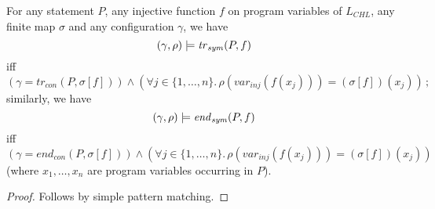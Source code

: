 \begin{lemma}\label{lem:symConcreteTranslationMatch}
    For any statement $P$, any injective function $f$ on program variables of $L_{\mathit{CHL}}$,
    any finite map $\sigma$ and any configuration $\gamma$,
    we have
    \begin{equation*}
        (\gamma, \rho) \models \mathit{tr}_{\mathit{sym}}(P, f)
    \end{equation*}
    iff %
    \begin{equation*}
        (\gamma = \mathit{tr}_{\mathit{con}}(P, \sigma[f])) \land (\forall j \in \{ 1, \ldots, n \}.\, \rho(\mathit{var}_{\mathit{inj}}(f(x_j))) = (\sigma[f])(x_j)) \, ;
    \end{equation*}
    similarly, we have
    \begin{equation*}
        (\gamma, \rho) \models \mathit{end}_{\mathit{sym}}(P, f)
    \end{equation*}
    iff %
    \begin{equation*}
        (\gamma = \mathit{end}_{\mathit{con}}(P, \sigma[f])) \land (\forall j \in \{ 1, \ldots, n \}.\, \rho(\mathit{var}_{\mathit{inj}}(f(x_j))) = (\sigma[f])(x_j))
    \end{equation*}
    (where $x_1,\ldots,x_n$ are program variables occurring in $P$).
\end{lemma}
\begin{proof}
    Follows by simple pattern matching.
\end{proof}

